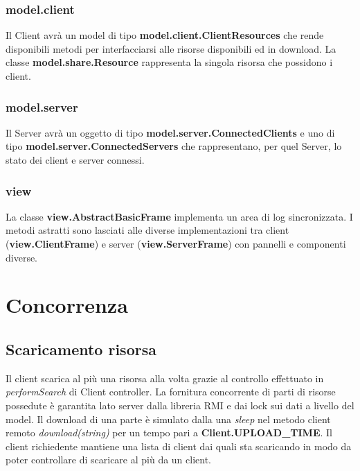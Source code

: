 \documentclass[
10pt, %
a4paper, %
oneside, %
BCOR5mm, %
]{scrartcl}
\begin{document}
 		\subsubsection{model.client}
 			
 			Il Client avrà un model di tipo \textbf{model.client.ClientResources} che rende disponibili metodi per interfacciarsi alle risorse disponibili ed in download.
 			La classe \textbf{model.share.Resource} rappresenta la singola risorsa che possidono i client.
 			
 		\subsubsection{model.server}

 			Il Server avrà un oggetto di tipo \textbf{model.server.ConnectedClients} e uno di tipo \textbf{model.server.ConnectedServers} che rappresentano, per quel Server, lo stato dei client e server connessi.

 		\subsubsection{view}

 			La classe \textbf{view.AbstractBasicFrame} implementa un area di log sincronizzata. I metodi astratti sono lasciati alle diverse implementazioni tra client (\textbf{view.ClientFrame}) e server (\textbf{view.ServerFrame}) con pannelli e componenti diverse.


\section{Concorrenza}

	\subsection{Scaricamento risorsa}
	Il client scarica al più una risorsa alla volta grazie al controllo effettuato in \emph{performSearch} di Client controller. La fornitura concorrente di parti di risorse possedute è garantita lato server dalla libreria RMI e dai lock sui dati a livello del model. Il download di una parte è simulato dalla una \emph{sleep} nel metodo client remoto \textit{download(string)} per un tempo pari a \textbf{Client.UPLOAD\_TIME}. Il client richiedente mantiene una lista di client dai quali sta scaricando in modo da poter controllare di scaricare al più da un client. 
\end{document}
